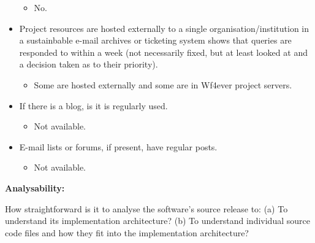 \begin{itemize}
  \begin{itemize}
  \itemsep1pt\parskip0pt
  \item
    No.
  \end{itemize}
\item
  Project resources are hosted externally to a single
  organisation/institution in a sustainbable e-mail archives or
  ticketing system shows that queries are responded to within a week
  (not necessarily fixed, but at least looked at and a decision taken as
  to their priority).

  \begin{itemize}
  \itemsep1pt\parskip0pt
  \item
    Some are hosted externally and some are in Wf4ever project servers.
  \end{itemize}
\item
  If there is a blog, is it is regularly used.

  \begin{itemize}
  \itemsep1pt\parskip0pt
  \item
    Not available.
  \end{itemize}
\item
  E-mail lists or forums, if present, have regular posts.

  \begin{itemize}
  \itemsep1pt\parskip0pt
  \item
    Not available.
  \end{itemize}
\end{itemize}

\textbf{Analysability:}

How straightforward is it to analyse the software's source release to:
(a) To understand its implementation architecture? (b) To understand
individual source code files and how they fit into the implementation
architecture?

